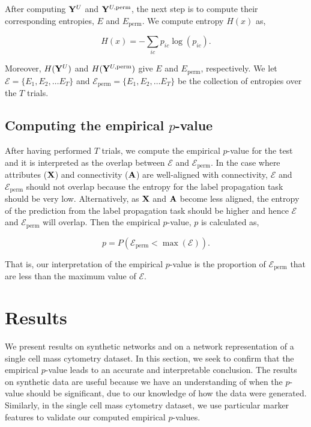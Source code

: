 After computing ${\bf Y}^{U}$ and ${\bf Y}^{U,\text{perm}}$, the next step is to compute their corresponding entropies, $E$ and $E_{\text{perm}}$. We compute entropy $H(x)$ as,

\begin{equation}
H(x)=-\sum_{ic}p_{ic}\log(p_{ic}).
\end{equation}

Moreover, $H({\bf Y}^{U})$ and $H({\bf Y}^{U,\text{perm}})$ give $E$ and $E_{\text{perm}}$, respectively. We let $\mathcal{E}=\{E_{1}, E_{2}, \dots E_{T}\}$ and $\mathcal{E}_{\text{perm}}=\{E_{1}, E_{2}, \dots E_{T}\}$ be the collection of entropies over the $T$ trials. 

\subsection{Computing the empirical $p$-value}
After having performed $T$ trials, we compute the empirical $p$-value for the test and it is interpreted as the overlap between $\mathcal{E}$ and $\mathcal{E}_{\text{perm}}$. In the case where attributes (${\bf X}$) and connectivity (${\bf A}$) are well-aligned with connectivity, $\mathcal{E}$ and $\mathcal{E}_{\text{perm}}$ should not overlap because the entropy for the label propagation task should be very low. Alternatively, as ${\bf X}$ and ${\bf A}$ become less aligned, the entropy of the prediction from the label propagation task should be higher and hence $\mathcal{E}$ and $\mathcal{E}_{\text{perm}}$ will overlap. Then the empirical $p$-value, $p$ is calculated as,

\begin{equation}
p=P(\mathcal{E}_{\text{perm}}<\max(\mathcal{E})).
\end{equation}

That is, our interpretation of the empirical $p$-value is the proportion of $\mathcal{E}_{\text{perm}}$ that are less than the maximum value of $\mathcal{E}$. 
 

\section{Results}
We present results on synthetic networks and on a network representation of a single cell mass cytometry dataset. In this section, we seek to confirm that the empirical $p$-value leads to an accurate and interpretable conclusion. The results on synthetic data are useful because we have an understanding of when the $p$-value should be significant, due to our knowledge of how the data were generated. Similarly, in the single cell mass cytometry dataset, we use particular marker features to validate our computed empirical $p$-values. 

